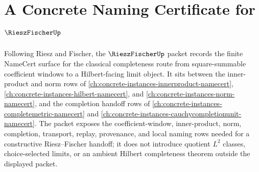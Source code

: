 \chapter{A Concrete Naming Certificate for $\RieszFischerUp$}
\label{ch:concrete-instances-riesz-fischer-namecert}

Following Riesz and Fischer, the $\RieszFischerUp$ packet records the finite NameCert surface for the classical completeness route from square-summable coefficient windows to a Hilbert-facing limit object. It sits between the inner-product and norm rows of \autoref{ch:concrete-instances-innerproduct-namecert}, \autoref{ch:concrete-instances-hilbert-namecert}, and \autoref{ch:concrete-instances-norm-namecert}, and the completion handoff rows of \autoref{ch:concrete-instances-completemetric-namecert} and \autoref{ch:concrete-instances-cauchycompletionunit-namecert}. The packet exposes the coefficient-window, inner-product, norm, completion, transport, replay, provenance, and local naming rows needed for a constructive Riesz--Fischer handoff; it does not introduce quotient $L^{2}$ classes, choice-selected limits, or an ambient Hilbert completeness theorem outside the displayed packet.


